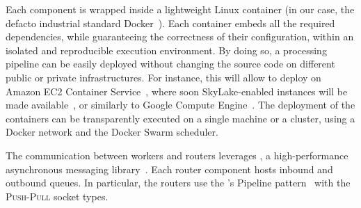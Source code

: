 

Each component is wrapped inside a lightweight Linux container (in our case, the defacto industrial standard Docker~\cite{docker}).
Each container embeds all the required dependencies, while guaranteeing the correctness of their configuration, within an isolated and reproducible execution environment.
By doing so, a \SYS processing pipeline can be easily deployed without changing the source code on different public or private infrastructures.
For instance, this will allow to deploy \SYS on Amazon EC2 Container Service~\cite{awsec2container}, where soon SkyLake-enabled instances will be made available~\cite{amazonskylake}, or similarly to Google Compute Engine~\cite{gceskylake}.
The deployment of the containers can be transparently executed on a single machine or a cluster, using a Docker network and the Docker Swarm\cite{docker:swarm_2016} scheduler.

The communication between workers and routers leverages \zmq, a high-performance asynchronous messaging library~\cite{zero_mq}.
Each router component hosts inbound and outbound queues.
In particular, the routers use the \zmq's Pipeline pattern~\cite{zero_mq:pipeline} with the \textsc{Push}-\textsc{Pull} socket types. 



